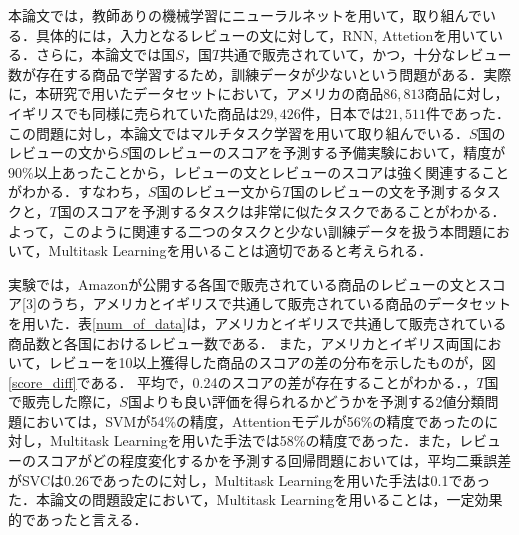 \documentclass[dvipdfmx,twocolumn,10.5pt]{jsarticle}
\begin{document}
本論文では，教師ありの機械学習にニューラルネットを用いて，取り組んでいる．具体的には，入力となるレビューの文に対して，RNN, Attetionを用いている．さらに，本論文では国$S$，国$T$共通で販売されていて，かつ，十分なレビュー数が存在する商品で学習するため，訓練データが少ないという問題がある．実際に，本研究で用いたデータセットにおいて，アメリカの商品$86,813$商品に対し，イギリスでも同様に売られていた商品は$29,426$件，日本では$21,511$件であった．
この問題に対し，本論文ではマルチタスク学習を用いて取り組んでいる．$S$国のレビューの文から$S$国のレビューのスコアを予測する予備実験において，精度が90\%以上あったことから，レビューの文とレビューのスコアは強く関連することがわかる．すなわち，$S$国のレビュー文から$T$国のレビューの文を予測するタスクと，$T$国のスコアを予測するタスクは非常に似たタスクであることがわかる．よって，このように関連する二つのタスクと少ない訓練データを扱う本問題において，Multitask Learningを用いることは適切であると考えられる．

実験では，Amazonが公開する各国で販売されている商品のレビューの文とスコア[3]のうち，アメリカとイギリスで共通して販売されている商品のデータセットを用いた．表\ref{num_of_data}は，アメリカとイギリスで共通して販売されている商品数と各国におけるレビュー数である．
また，アメリカとイギリス両国において，レビューを10以上獲得した商品のスコアの差の分布を示したものが，図\ref{score_diff}である．
平均で，0.24のスコアの差が存在することがわかる．，$T$国で販売した際に，$S$国よりも良い評価を得られるかどうかを予測する2値分類問題においては，SVMが54\%の精度，Attentionモデルが56\%の精度であったのに対し，Multitask Learningを用いた手法では58\%の精度であった．また，レビューのスコアがどの程度変化するかを予測する回帰問題においては，平均二乗誤差がSVCは0.26であったのに対し，Multitask Learningを用いた手法は0.1であった．本論文の問題設定において，Multitask Learningを用いることは，一定効果的であったと言える．
\end{document}
